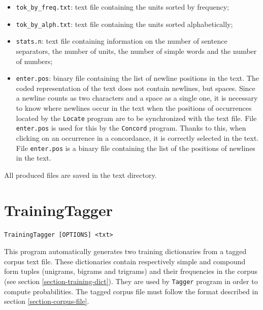 \begin{itemize}
  \item \verb+tok_by_freq.txt+: text file containing the units sorted by frequency;
  \item \verb+tok_by_alph.txt+: text file containing the units sorted alphabetically;
  \item \verb+stats.n+: text file containing information on the number of
  sentence separators, the number of units, the number of simple words and the
  number of numbers;

  \item \verb+enter.pos+: binary file containing the list of newline positions in
  the text. The coded representation of the text does not contain newlines, but
  spaces. Since a newline counts as two characters and a space as a single one,
  it is necessary to know where newlines occur in the text when the positions of
  occurrences located by the \verb+Locate+ program are to be synchronized with
  the text file. File \verb+enter.pos+ is used for this by the \verb+Concord+
  program. Thanks to this, when clicking on an occurrence in a concordance, it is
  correctly selected in the text. File \verb$enter.pos$ is a binary file
  containing the list of the positions of newlines in the text.

\end{itemize}

\bigskip
\noindent All produced files are saved in the text directory.






\section{TrainingTagger}
\verb+TrainingTagger [OPTIONS] <txt>+

\bigskip
\noindent {}This 
program automatically generates two training dictionaries from a tagged corpus text file. These dictionaries
contain respectively simple and compound form tuples (unigrams, bigrams and trigrams) 
and their frequencies in the corpus (see section \ref{section-training-dict}). They are used by \verb+Tagger+ program in order to compute
probabilities. The tagged corpus file must follow the format described in section \ref{section-corpus-file}.

